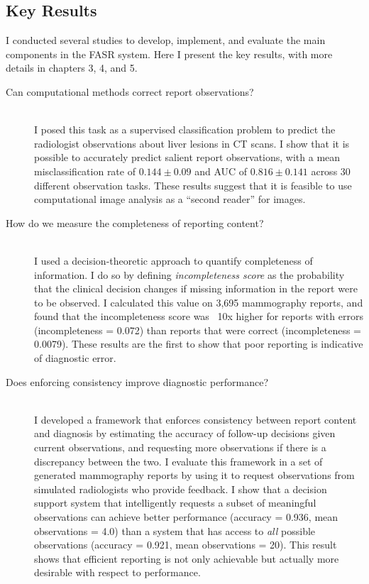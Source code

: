 \subsection{Key Results}

I conducted several studies to develop, implement, and evaluate the main components in the FASR system. Here I present the key results, with more details in chapters 3, 4, and 5. 

\begin{description}
	\item[Can computational methods correct report observations?] \hfill \\
	I posed this task as a supervised classification problem to predict the radiologist observations about liver lesions in CT scans. I show that it is possible to accurately predict salient report observations, with a mean misclassification rate of $0.144\pm0.09$ and AUC of $0.816\pm0.141$ across 30 different observation tasks. These results suggest that it is feasible to use computational image analysis as a ``second reader'' for images.
	
	\item[How do we measure the completeness of reporting content?] \hfill \\
	I used a decision-theoretic approach to quantify completeness of information. I do so by defining \emph{incompleteness score} as the probability that the clinical decision changes if missing information in the report were to be observed. I calculated this value on 3,695 mammography reports, and found that the incompleteness score was ~10x higher for reports with errors (incompleteness = 0.072) than reports that were correct (incompleteness = 0.0079). These results are the first to show that poor reporting is indicative of diagnostic error.
	
	\item[Does enforcing consistency improve diagnostic performance?] \hfill \\
	I developed a framework that enforces consistency between report content and diagnosis by estimating the accuracy of follow-up decisions given current observations, and requesting more observations if there is a discrepancy between the two. I evaluate this framework in a set of generated mammography reports by using it to request observations from simulated radiologists who provide feedback. I show that a decision support system that intelligently requests a subset of meaningful observations can achieve better performance (accuracy = 0.936, mean observations = 4.0) than a system that has access to \emph{all} possible observations (accuracy = 0.921, mean observations = 20). This result shows that efficient reporting is not only achievable but actually more desirable with respect to performance.
\end{description}

